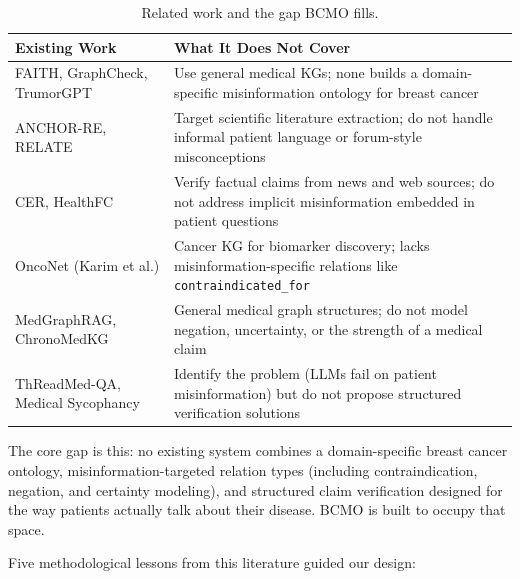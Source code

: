 \documentclass[11pt,a4paper]{article}
\begin{document}
\begin{table}[h]
    \centering
    \small
    \caption{Related work and the gap BCMO fills.}
    \label{tab:gaps}
    \vspace{2pt}
    \begin{tabular}{@{}p{4cm}p{9cm}@{}}
        \toprule
        \textbf{Existing Work} & \textbf{What It Does Not Cover} \\
        \midrule
        FAITH, GraphCheck, TrumorGPT
            & Use general medical KGs; none builds a domain-specific misinformation ontology for breast cancer \\[4pt]
        ANCHOR-RE, RELATE
            & Target scientific literature extraction; do not handle informal patient language or forum-style misconceptions \\[4pt]
        CER, HealthFC
            & Verify factual claims from news and web sources; do not address implicit misinformation embedded in patient questions \\[4pt]
        OncoNet (Karim et al.)
            & Cancer KG for biomarker discovery; lacks misinformation-specific relations like \texttt{contraindicated\_for} \\[4pt]
        MedGraphRAG, ChronoMedKG
            & General medical graph structures; do not model negation, uncertainty, or the strength of a medical claim \\[4pt]
        ThReadMed-QA, Medical Sycophancy
            & Identify the problem (LLMs fail on patient misinformation) but do not propose structured verification solutions \\
        \bottomrule
    \end{tabular}
\end{table}

The core gap is this: no existing system combines a domain-specific breast cancer ontology, misinformation-targeted relation types (including contraindication, negation, and certainty modeling), and structured claim verification designed for the way patients actually talk about their disease. BCMO is built to occupy that space.

Five methodological lessons from this literature guided our design:
\end{document}

